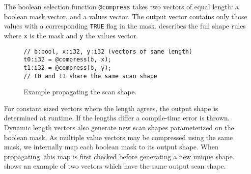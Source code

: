 The boolean selection function \texttt{@compress} takes two vectors of equal
length: a boolean mask vector, and a values vector. The output vector contains only
those values with a corresponding \texttt{TRUE} flag in the mask. 
describes the full shape rules where \texttt{x} is the mask and \texttt{y} the values
vector.

\begin{figure}[htbp]
\begin{lstlisting}[language=HorseIR, frame=single, basicstyle=\footnotesize]
// b:bool, x:i32, y:i32 (vectors of same length)
t0:i32 = @compress(b, x);
t1:i32 = @compress(b, y);
// t0 and t1 share the same scan shape
\end{lstlisting}
\vspace{-3mm}
\caption{Example propagating the scan shape.} \label{fig:scan_shape}
\end{figure}

For constant sized vectors where the length agrees, the output shape is determined at
runtime. If the lengths differ a compile-time error is thrown. Dynamic length vectors
also generate new scan shapes parameterized on the boolean mask. As multiple value
vectors may be compressed using the same mask, we internally map each boolean mask
to its output shape. When propagating, this map is first checked before generating
a new unique shape.  shows an example of two vectors which
have the same output scan shape.



